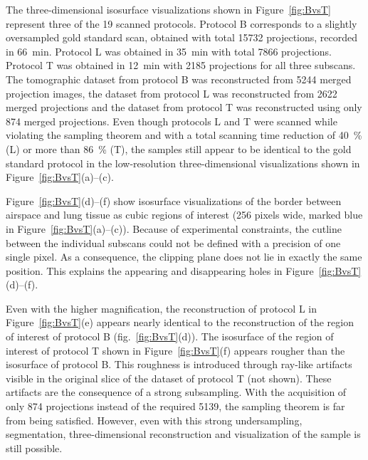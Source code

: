 The three-dimensional isosurface visualizations shown in Figure~\ref{fig:BvsT} represent three of the 19 scanned protocols. Protocol B corresponds to a slightly oversampled gold standard scan, obtained with total 15732 projections, recorded in \SI{66}{\minute}. Protocol L was obtained in \SI{35}{\minute} with total 7866 projections. Protocol T was obtained in \SI{12}{\minute} with 2185 projections for all three subscans. The tomographic dataset from protocol B was reconstructed from 5244 merged projection images, the dataset from protocol L was reconstructed from 2622 merged projections and the dataset from protocol T was reconstructed using only 874 merged projections. Even though protocols L and T were scanned while violating the sampling theorem and with a total scanning time reduction of \SI{40}{\percent} (L) or more than \SI{86}{\percent} (T), the samples still appear to be identical to the gold standard protocol in the low-resolution three-dimensional visualizations shown in Figure~\ref{fig:BvsT}(a)--(c).

Figure~\ref{fig:BvsT}(d)--(f) show isosurface visualizations of the border between airspace and lung tissue as cubic regions of interest (256 pixels wide, marked blue in Figure~\ref{fig:BvsT}(a)--(c)). Because of experimental constraints, the cutline between the individual subscans could not be defined with a precision of one single pixel. As a consequence, the clipping plane does not lie in exactly the same position. This explains the appearing and disappearing holes in Figure~\ref{fig:BvsT}(d)--(f).

Even with the higher magnification, the reconstruction of protocol L in Figure~\ref{fig:BvsT}(e) appears nearly identical to the reconstruction of the region of interest of protocol B (fig.~\ref{fig:BvsT}(d)). The isosurface of the region of interest of protocol T shown in Figure~\ref{fig:BvsT}(f) appears rougher than the isosurface of protocol B. This roughness is introduced through ray-like artifacts visible in the original slice of the dataset of protocol T (not shown). These artifacts are the consequence of a strong subsampling. With the acquisition of only 874 projections instead of the required 5139, the sampling theorem is far from being satisfied. However, even with this strong undersampling, segmentation, three-dimensional reconstruction and visualization of the sample is still possible.

